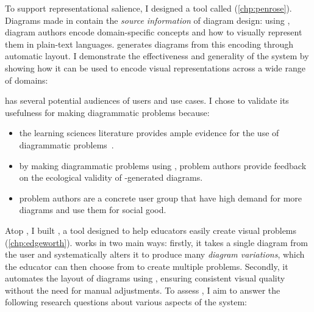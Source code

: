 To support representational salience, I designed a tool called \Penrose (\cref{chp:penrose}). Diagrams made in \Penrose contain the \emph{source information} of diagram design: using \Penrose, diagram authors encode domain-specific concepts and how to visually represent them in plain-text languages. \Penrose generates diagrams from this encoding through automatic layout. I demonstrate the effectiveness and generality of the system by showing how it can be used to encode visual representations across a wide range of domains:

\label{rq:expressiveness}

\Penrose has several potential audiences of users and use cases. I chose to validate its usefulness for making diagrammatic problems because:

\begin{itemize}
    \item the learning sciences literature provides ample evidence for the use of diagrammatic problems~\cite{multipleReps, mayer_multimedia_2002, blum_combining_1998}.
    \item by making diagrammatic problems using \Penrose, problem authors provide feedback on the ecological validity of \Penrose-generated diagrams.
    \item problem authors are a concrete user group that have high demand for more diagrams and use them for social good.
\end{itemize}

Atop \Penrose, I built \Edgeworth, a tool designed to help educators easily create visual problems (\cref{chp:edgeworth}). \Edgeworth works in two main ways: firstly, it takes a single diagram from the user and systematically alters it to produce many \emph{diagram variations}, which the educator can then choose from to create multiple problems. Secondly, it automates the layout of diagrams using \Penrose, ensuring consistent visual quality without the need for manual adjustments. To assess \Edgeworth, I aim to answer the following research questions about various aspects of the system:



